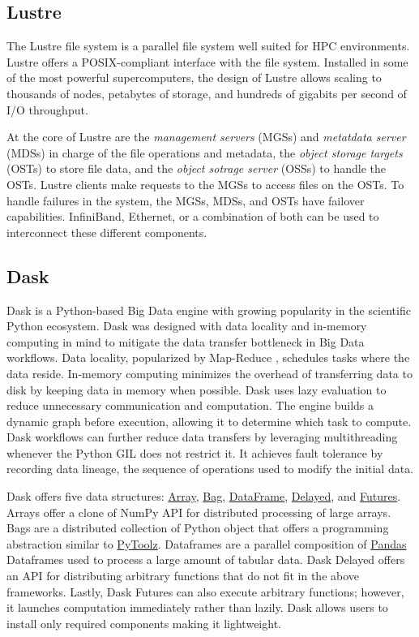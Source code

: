 \documentclass[conference]{IEEEtran}
\begin{document}
\subsection{Lustre}
The Lustre file system is a parallel file system well suited for HPC environments.
Lustre offers a POSIX-compliant interface with the file system.
Installed in some of the most powerful supercomputers, the design of Lustre allows
scaling to thousands of nodes, petabytes of storage, and hundreds of gigabits per second of I/O throughput.

At the core of Lustre are the \textit{management servers} (MGSs) and \textit{metatdata server} (MDSs) in charge of the file operations and metadata,
the \textit{object storage targets} (OSTs) to store file data, and the \textit{object sotrage server} (OSSs) to handle the OSTs.
Lustre clients make requests to the MGSs to access files on the OSTs.
To handle failures in the system, the MGSs, MDSs, and OSTs have failover capabilities.
InfiniBand, Ethernet, or a combination of both can be used to interconnect these different components.

\subsection{Dask}
Dask is a Python-based Big Data engine with growing popularity in the scientific Python ecosystem.
Dask was designed with data locality and in-memory computing in mind to mitigate the data transfer bottleneck in Big Data workflows.
Data locality, popularized by Map-Reduce \cite{dean2008mapreduce}, schedules tasks where the data reside.
In-memory computing minimizes the overhead of transferring data to disk by keeping data in memory when possible.
Dask uses lazy evaluation to reduce unnecessary communication and computation.
The engine builds a dynamic graph before execution, allowing it to determine which task to compute.
Dask workflows can further reduce data transfers by leveraging multithreading whenever the Python GIL does not restrict it.
It achieves fault tolerance by recording data lineage, the sequence of operations used to modify the initial data.

Dask offers five data structures:
\href{https://docs.dask.org/en/latest/array.html}{Array},
\href{https://docs.dask.org/en/latest/bag.html}{Bag},
\href{https://docs.dask.org/en/latest/dataframe.html}{DataFrame},
\href{https://docs.dask.org/en/latest/delayed.html}{Delayed},
and \href{https://docs.dask.org/en/latest/futures.html}{Futures}.
Arrays offer a clone of NumPy API for distributed processing of large arrays.
Bags are a distributed collection of Python object that offers a programming abstraction similar to \href{https://toolz.readthedocs.io/en/latest/}{PyToolz}.
Dataframes are a parallel composition of \href{https://pandas.pydata.org/}{Pandas} Dataframes used to process a large amount of tabular data.
Dask Delayed offers an API for distributing arbitrary functions that do not fit in the above frameworks.
Lastly, Dask Futures can also execute arbitrary functions; however, it launches computation immediately rather than lazily.
Dask allows users to install only required components making it lightweight.
\end{document}
